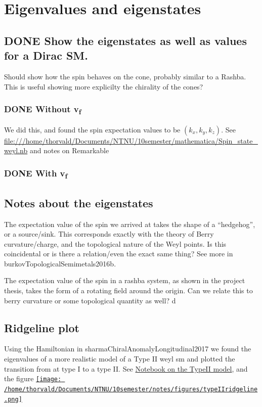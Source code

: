 \documentclass[11pt]{article}
\begin{document}
\section{Eigenvalues and eigenstates}
\label{sec:org6b31ee0}

\subsection{{\bfseries\sffamily DONE} Show the eigenstates as well as values for a Dirac SM.}
\label{sec:orgc3402d6}
Should show how the spin behaves on the cone, probably similar to a Rashba.
This is useful showing more explicilty the chirality of the cones?

\subsubsection{{\bfseries\sffamily DONE} Without v\textsubscript{f}}
\label{sec:orgcce7273}
We did this, and found the spin expectation values to be \((k_x, k_y, k_z)\).
See \url{file:///home/thorvald/Documents/NTNU/10semester/mathematica/Spin\_state\_weyl.nb} and notes on Remarkable

\subsubsection{{\bfseries\sffamily DONE} With v\textsubscript{f}}
\label{sec:org9f6edc7}

\subsection{Notes about the eigenstates}
\label{sec:org1e85d39}
The expectation value of the spin we arrived at takes the shape of a ``hedgehog'', or a source/sink.
This corresponds exactly with the theory of Berry curvature/charge, and the topological nature of the Weyl points.
Is this coincidental or is there a relation/even the exact same thing?
See more in burkovTopologicalSemimetals2016b.

The expectation value of the spin in a rashba system, as shown in the project thesis, takes the form of a rotating field around the origin.
Can we relate this to berry curvature or some topological quantity as well?
d

\subsection{Ridgeline plot}
\label{sec:orgc5c2be2}
Using the Hamiltonian in sharmaChiralAnomalyLongitudinal2017 we found the eigenvalues of a more realistic model of a Type II weyl sm and plotted the transition from at type I to a type II.
See \href{file:///home/thorvald/Documents/NTNU/10semester/mathematica/TYPEII\_model.nb}{Notebook on the TypeII model}, and the figure \href{figures/typeIIridgeline.png}{\texttt{[image: /home/thorvald/Documents/NTNU/10semester/notes/figures/typeIIridgeline.png]}}
\end{document}
